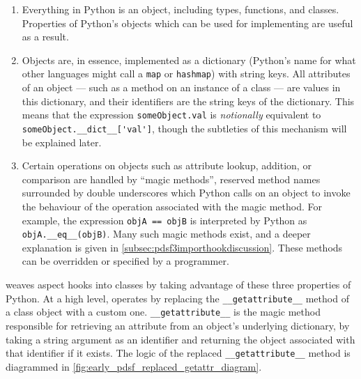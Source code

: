 \begin{enumerate}
    \item Everything in Python is an object, including types, functions, and
    classes. Properties of Python's objects which can be used for implementing
    \aop{} are useful as a result.
    \item Objects are, in essence, implemented as a dictionary (Python's
    name for what other languages might call a \lstinline{map} or
    \lstinline{hashmap}) with string keys. All attributes of an object --- such
    as a method on an instance of a class --- are values in this dictionary, and
    their identifiers are the string keys of the dictionary. This means that the
    expression \lstinline{someObject.val} is \emph{notionally} equivalent to
    \lstinline{someObject.__dict__['val']}, though the subtleties of this
    mechanism will be explained later.
    \item Certain operations on objects such as attribute lookup, addition, or
    comparison are handled by ``magic methods'', reserved method names
    surrounded by double underscores which Python calls on an object to invoke
    the behaviour of the operation associated with the magic method. For
    example, the expression \lstinline{objA == objB} is interpreted by Python as
    \lstinline{objA.__eq__(objB)}. Many such magic methods exist, and a deeper
    explanation is given in \cref{subsec:pdsf3importhookdiscussion}. These
    methods can be overridden or specified by a programmer.
\end{enumerate}

\pydysofu weaves aspect hooks into classes by taking advantage of these three
properties of Python. At a high level, \pydysofu operates by replacing the
\lstinline{__getattribute__} method of a class object with a custom one.
\lstinline{__getattribute__} is the magic method responsible for retrieving an
attribute from an object's underlying dictionary, by taking a string argument as
an identifier and returning the object associated with that identifier if it
exists. The logic of the replaced \lstinline{__getattribute__} method is
diagrammed in \cref{fig:early_pdsf_replaced_getattr_diagram}.

